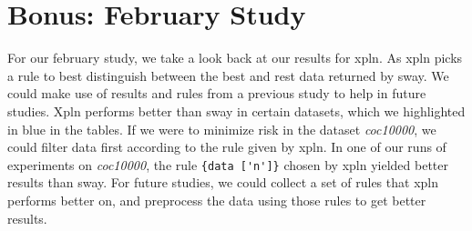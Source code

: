 \section{Bonus: February Study}
\label{sec:bonus_february}

For our february study, we take a look back at our results for xpln. As
xpln picks a rule to best distinguish between the best and rest data
returned by sway. We could make use of results and rules from a previous
study to help in future studies. Xpln performs better than sway in
certain datasets, which we highlighted in blue in the tables. 
If we were to minimize risk in the dataset
\textit{coc10000}, we could filter data first according to the rule
given by xpln. In one of our runs of experiments on \textit{coc10000},
the rule \verb|{data ['n']}| chosen by xpln yielded better results than
sway. For future studies, we could collect a set of rules that xpln
performs better on, and preprocess the data using those rules to get
better results.